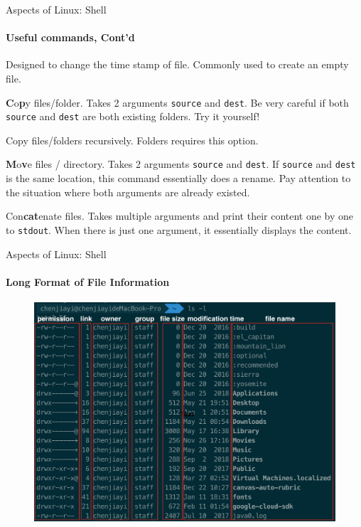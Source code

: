 \begin{frame}{Aspects of Linux: Shell}
\framesubtitle{Useful commands, Cont'd}
\begin{description}[mkdir]
	\item[touch] Designed to change the time stamp of file. Commonly used to create an empty file.
	\item[cp] \textbf{C}o\textbf{p}y files/folder. Takes 2 arguments \texttt{source} and \texttt{dest}. Be very careful if both \texttt{source} and \texttt{dest} are both existing folders. Try it yourself!
	\begin{description}[-]
		\small
		\item[-r] Copy files/folders recursively. Folders requires this option.  
	\end{description}
	\item[mv] \textbf{M}o\textbf{v}e files / directory. Takes 2 arguments \texttt{source} and \texttt{dest}. If \texttt{source} and \texttt{dest} is the same location, this command essentially does a rename. Pay attention to the situation where both arguments are already existed.
	\item[cat] Con\textbf{cat}enate files. Takes multiple arguments and print their content one by one to \texttt{stdout}. When there is just one argument, it essentially displays the content.
\end{description}
\end{frame}


\begin{frame}{Aspects of Linux: Shell}
\framesubtitle{Long Format of File Information}
	\begin{figure}
		\vspace{-0.1in}
		\centering
		\includegraphics[width=0.8\linewidth]{fig/rc2_longformat}
	\end{figure}
\end{frame}

